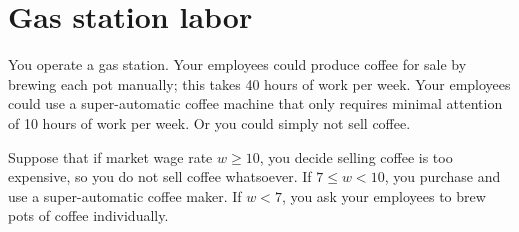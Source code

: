 \documentclass{assignment}
\date{Friday 30 September 2022}
\begin{document}
\RaggedRight

\beginsolutions{}

\section*{Gas station labor}

You operate a gas station. Your employees could produce coffee for sale by brewing each pot manually; this takes 40 hours of work per week. Your employees could use a super-automatic coffee machine that only requires minimal attention of 10 hours of work per week. Or you could simply not sell coffee.

Suppose that if market wage rate $w\geq10$, you decide selling coffee is too expensive, so you do not sell coffee whatsoever. If $7 \leq w < 10$, you purchase and use a super-automatic coffee maker. If $w < 7$, you ask your employees to brew pots of coffee individually.
\end{document}
